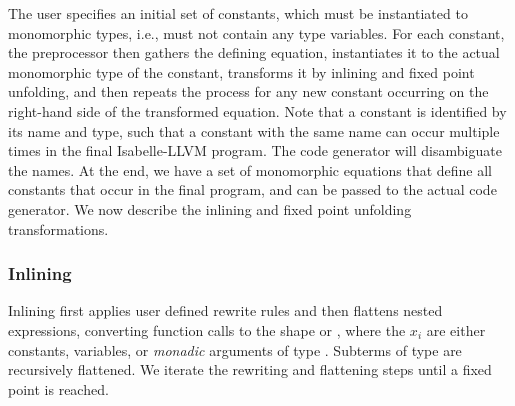 \documentclass[a4paper,USenglish,cleveref, autoref]{lipics-v2019}
\begin{document}
The user specifies an initial set of constants, which must be instantiated to monomorphic types, i.e., must not contain any type variables.
For each constant, the preprocessor then gathers the defining equation, 
instantiates it to the actual monomorphic type of the constant, transforms it by inlining and fixed point unfolding,
and then repeats the process for any new constant occurring on the right-hand side of the transformed equation.
Note that a constant is identified by its name and type, such that a constant with the same name can occur multiple 
times in the final Isabelle-LLVM program. The code generator will disambiguate the names.
At the end, we have a set of monomorphic equations that define all constants that occur in the final program, and can be passed to the actual code generator.
We now describe the inlining and fixed point unfolding transformations.

% 
% 


\subsubsection{Inlining}
Inlining first applies user defined rewrite rules and then flattens nested expressions, converting function calls to the shape 
 or , where the $x_i$ are either constants, variables, or \emph{monadic} arguments
of type . Subterms of type  are recursively flattened.
We iterate the rewriting and flattening steps until a fixed point is reached. 
\end{document}
